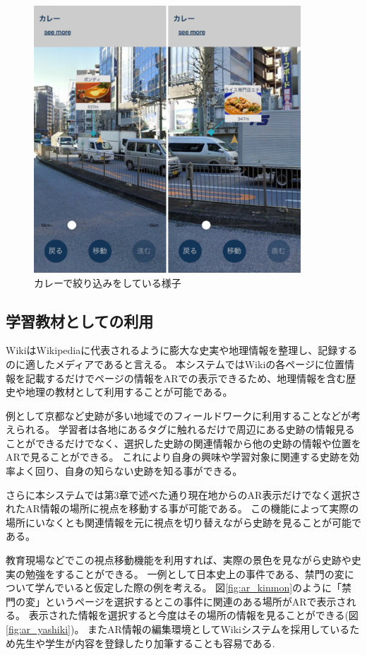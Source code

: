 \begin{figure}[h]
  \centering
  \includegraphics[width=100mm]{images/ar_navigation_jibotyo_link.png}
  \caption{カレーで絞り込みをしている様子} \label{fig:ar_navigation_jibotyo_link}
\end{figure}


\subsection{学習教材としての利用}
WikiはWikipediaに代表されるように膨大な史実や地理情報を整理し、記録するのに適したメディアであると言える。
本システムではWikiの各ページに位置情報を記載するだけでページの情報をARでの表示できるため、地理情報を含む歴史や地理の教材として利用することが可能である。

例として京都など史跡が多い地域でのフィールドワークに利用することなどが考えられる。
学習者は各地にあるタグに触れるだけで周辺にある史跡の情報見ることができるだけでなく、選択した史跡の関連情報から他の史跡の情報や位置をARで見ることができる。
これにより自身の興味や学習対象に関連する史跡を効率よく回り、自身の知らない史跡を知る事ができる。

さらに本システムでは第3章で述べた通り現在地からのAR表示だけでなく選択されたAR情報の場所に視点を移動する事が可能である。
この機能によって実際の場所にいなくとも関連情報を元に視点を切り替えながら史跡を見ることが可能である。

教育現場などでこの視点移動機能を利用すれば、実際の景色を見ながら史跡や史実の勉強をすることができる。
一例として日本史上の事件である、禁門の変について学んでいると仮定した際の例を考える。
図\ref{fig:ar_kinmon}のように「禁門の変」というページを選択するとこの事件に関連のある場所がARで表示される。
表示された情報を選択すると今度はその場所の情報を見ることができる(図\ref{fig:ar_yashiki})。
またAR情報の編集環境としてWikiシステムを採用しているため先生や学生が内容を登録したり加筆することも容易である.

